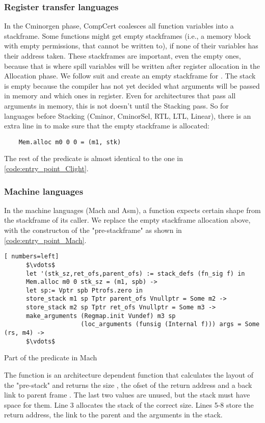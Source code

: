 \subsubsection{Register transfer languages}
In the Cminorgen phase, CompCert coalesces  all function variables into a stackframe. Some functions might get empty stackframes (i.e., a memory block with empty permissions, that cannot be written to), if none of their variables has their address taken. These stackframes are important, even the empty ones, because that is where spill variables will be written after register allocation in the Allocation phase. We follow suit and create an empty stackframe for . The stack is empty because the compiler has not yet decided what arguments will be passed in memory and which ones in register. Even for architectures that pass all arguments in memory, this is not doesn't until the Stacking pass. So for languages before Stacking (Cminor, CminorSel, RTL, LTL, Linear), there is an extra line in  to make sure that the empty stackframe is allocated:
\begin{lstlisting}
	Mem.alloc m0 0 0 = (m1, stk) \end{lstlisting}
The rest of the predicate is almost identical to the one in \ref{code:entry_point_Clight}.

\subsubsection{Machine languages}

In the machine languages (Mach and Asm), a function expects certain shape from the stackframe of its caller. We replace the empty stackframe allocation above, with the constructon of the "pre-stackframe" as shown in \ref{code:entry_point_Mach}.
\begin{table}
\begin{lstlisting}[ numbers=left]
      $\vdots$
      let '(stk_sz,ret_ofs,parent_ofs) := stack_defs (fn_sig f) in
      Mem.alloc m0 0 stk_sz = (m1, spb) ->
      let sp:= Vptr spb Ptrofs.zero in
      store_stack m1 sp Tptr parent_ofs Vnullptr = Some m2 ->
      store_stack m2 sp Tptr ret_ofs Vnullptr = Some m3 ->
      make_arguments (Regmap.init Vundef) m3 sp
                     (loc_arguments (funsig (Internal f))) args = Some (rs, m4) ->
      $\vdots$
\end{lstlisting}
\caption{Part of the  predicate in Mach}\label{code:entry_point_Mach}
\end{table}
The function  is an architecture dependent function that calculates the layout of the "pre-stack" and returns the size , the ofset of the return address  and a back link to parent frame . The last two values are unused, but the stack must have space for them. Line 3 allocates the stack of the correct size. Lines 5-8 store the return address, the link to the parent and the arguments in the stack. 